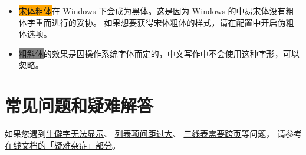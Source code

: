 \begin{itemize}[nosep]
  \item \colorbox{orange}{宋体粗体}在 Windows 下会成为黑体。这是因为 Windows 的中易宋体没有粗体字重而进行的妥协。
    如果想要获得宋体粗体的样式，请在配置中开启伪粗体选项。
  \item \colorbox{gray}{粗斜体}的效果是因操作系统字体而定的，中文写作中不会使用这种字形，可以忽略。
\end{itemize}


\section{常见问题和疑难解答}

如果您遇到\href{https://bithesis.bitnp.net/faq/char-missing.html}{生僻字无法显示}、
\href{https://bithesis.bitnp.net/faq/enumitem-nosep.html}{列表项间距过大}、
\href{https://bithesis.bitnp.net/faq/longtable.html}{三线表需要跨页}等问题，
请参考\textcolor{magenta}{\href{https://bithesis.bitnp.net/faq/}{在线文档的「疑难杂症」部分}}。
